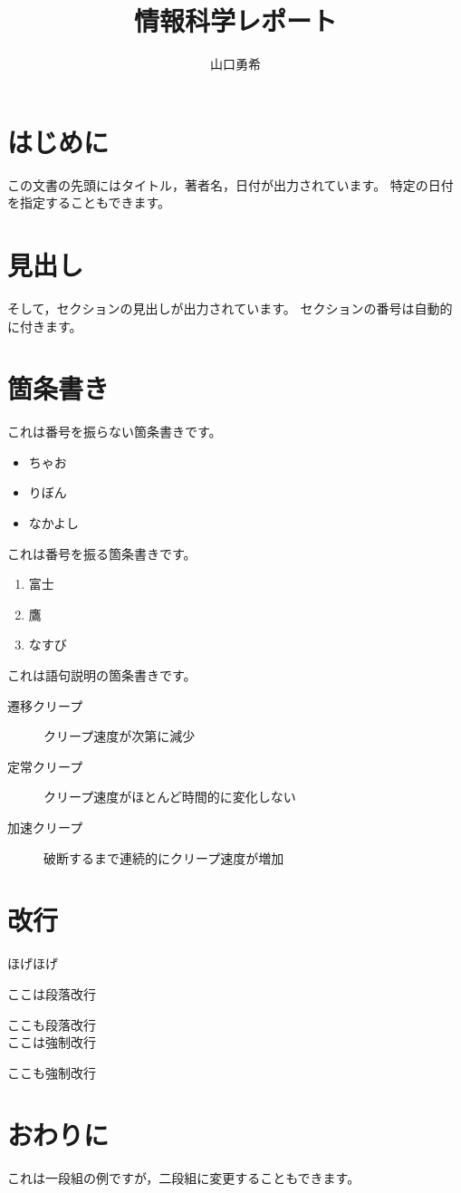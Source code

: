 \documentclass[11pt]{jsarticle}
\begin{document}
\title{情報科学レポート}
\author{山口勇希}
\maketitle

\section{はじめに}

この文書の先頭にはタイトル，著者名，日付が出力されています。
特定の日付を指定することもできます。

\section{見出し}

そして，セクションの見出しが出力されています。
セクションの番号は自動的に付きます。

\section{箇条書き}

これは番号を振らない箇条書きです。

\begin{itemize}
  \item ちゃお
  \item りぼん
  \item なかよし
\end{itemize}

これは番号を振る箇条書きです。

\begin{enumerate}
  \item 富士
  \item 鷹
  \item なすび
\end{enumerate}

これは語句説明の箇条書きです。

\begin{description}
  \item[遷移クリープ] クリープ速度が次第に減少
  \item[定常クリープ] クリープ速度がほとんど時間的に変化しない
  \item[加速クリープ] 破断するまで連続的にクリープ速度が増加
\end{description}

\section{改行}

ほげほげ

ここは段落改行 \par
ここも段落改行 \\
ここは強制改行

\noindent
ここも強制改行

\section{おわりに}

これは一段組の例ですが，二段組に変更することもできます。
\end{document}
